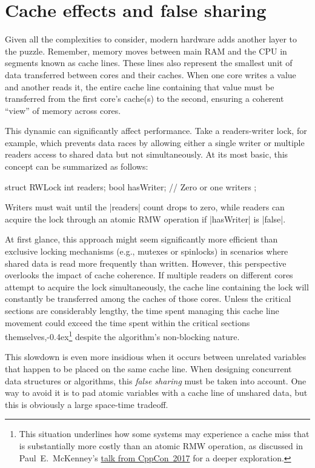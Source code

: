 \documentclass[fontsize=10pt, oneside]{scrartcl}
\newcommand{\punckern}{\kern-0.4ex}
\newcommand{\introduce}[1]{\textit{#1}}
\begin{document}
\section{Cache effects and false sharing}
\label{false-sharing}

Given all the complexities to consider, modern hardware adds another layer to the puzzle.
Remember, memory moves between main \textsc{RAM} and the \textsc{CPU} in segments known as cache lines.
These lines also represent the smallest unit of data transferred between cores and their caches.
When one core writes a value and another reads it,
the entire cache line containing that value must be transferred from the first core's cache(s) to the second,
ensuring a coherent ``view'' of memory across cores.

This dynamic can significantly affect performance.
Take a readers-writer lock, for example,
which prevents data races by allowing either a single writer or multiple readers access to shared data but not simultaneously.
At its most basic, this concept can be summarized as follows:
\begin{cppcode}
struct RWLock {
    int readers;
    bool hasWriter; // Zero or one writers
};
\end{cppcode}
Writers must wait until the \cc|readers| count drops to zero,
while readers can acquire the lock through an atomic \textsc{RMW} operation if \cc|hasWriter| is \cpp|false|.

At first glance, this approach might seem significantly more efficient than exclusive locking mechanisms (e.g., mutexes or spinlocks) in scenarios where shared data is read more frequently than written.
However, this perspective overlooks the impact of cache coherence.
If multiple readers on different cores attempt to acquire the lock simultaneously,
the cache line containing the lock will constantly be transferred among the caches of those cores.
Unless the critical sections are considerably lengthy,
the time spent managing this cache line movement could exceed the time spent within the critical sections themselves,\punckern\footnote{%
This situation underlines how some systems may experience a cache miss that is substantially more costly than an atomic \textsc{RMW} operation,
as discussed in Paul~E.\ McKenney's
\href{https://www.youtube.com/watch?v=74QjNwYAJ7M}{talk from CppCon~2017}
for a deeper exploration.}
despite the algorithm's non-blocking nature.

This slowdown is even more insidious when it occurs between unrelated variables that happen to be placed on the same cache line.
When designing concurrent data structures or algorithms,
this \introduce{false sharing} must be taken into account.
One way to avoid it is to pad atomic variables with a cache line of unshared data, but this is obviously a large space-time tradeoff.
\end{document}
